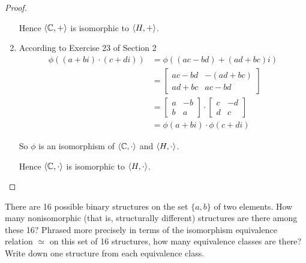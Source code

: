 \begin{proof}
\begin{enumerate}[label={\textbf{\alph*.}},topsep=0pt,itemsep=0pt]
              Hence $\left\langle{\mathbb{C},+}\right\rangle$ is isomorphic to $\left\langle{H,+}\right\rangle$.
        \item According to Exercise 23 of Section 2
              \begin{align*}
                  \phi((a + bi) \cdot (c + di)) & = \phi((ac - bd) + (ad + bc)i)    \\
                                                & = \begin{bmatrix}
                                                        ac - bd & -(ad + bc) \\
                                                        ad + bc & ac - bd
                                                    \end{bmatrix}            \\
                                                & = \begin{bmatrix}
                                                        a & -b \\
                                                        b & a
                                                    \end{bmatrix} \cdot
                  \begin{bmatrix}
                      c & -d \\
                      d & c
                  \end{bmatrix}                                                    \\
                                                & = \phi(a + bi) \cdot \phi(c + di)
              \end{align*}

              So $\phi$ is an isomorphism of $\left\langle{\mathbb{C},\cdot}\right\rangle$ and $\left\langle{H,\cdot}\right\rangle$.

              Hence $\left\langle{\mathbb{C},\cdot}\right\rangle$ is isomorphic to $\left\langle{H,\cdot}\right\rangle$.
    \end{enumerate}

\end{proof}

\begin{exercise}
    There are 16 possible binary structures on the set $\{ a, b \}$ of two elements. How many nonisomorphic (that is, structurally different) structures are there among these 16? Phrased more precisely in terms of the isomorphism equivalence relation $\simeq$ on this set of 16 structures, how many equivalence classes are there? Write down one
    structure from each equivalence class.
\end{exercise}

